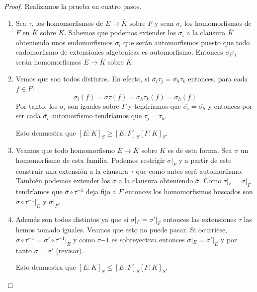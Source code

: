\begin{proof}
Realizamos la prueba en cuatro pasos.

\begin{enumerate}
\item Sea $\tau_i$ los homomorfismos de $E \to \overline{K}$ sobre $F$ y sean $\sigma_i$ los homomorfismos de $F$ en $\overline{K}$ sobre $K$. Sabemos que podemos extender los $\sigma_i$ a la clausura $\overline{K}$ obteniendo unos endomorfismos $\overline{\sigma_i}$ que serán automorfismos puesto que todo endomorfismo de extensiones algebraicas es automorfismo. Entonces $\overline{\sigma_i}\tau_i$ serán homomorfismos $E \to \overline{K}$ sobre $K$. 
\item Vemos que son todos distintos. En efecto, si $\overline{\sigma_i} \tau_j = \overline{\sigma_h}\tau_k$ entonces, para cada $f \in F$: $$\sigma_i(f) = \overline{\sigma}\tau(f) = \overline{\sigma_h}\tau_k(f) = \sigma_h(f)$$ Por tanto, los $\sigma_i$ son iguales sobre $F$ y tendríamos que $\overline{\sigma_i} = \overline{\sigma_h}$ y entonces por ser cada $\overline{\sigma_i}$ automorfismo tendríamos que $\tau_j = \tau_k$. 

Esto demuestra que $[E:K]_S \ge [E:F]_S[F:K]_S$. 
\item Veamos que todo homomorfismo $E \to \overline{K}$ sobre $K$ es de esta forma. Sea $\sigma$ un homomorfismo de esta familia. Podemos restrigir $\sigma|_F$ y a partir de este construir una extensión a la clausura $\tau$ que como antes será automorfismo. También podemos extender los $\sigma$ a la clausura obteniendo $\overline{\sigma}$. Como $\tau|_F = \sigma|_F$ tendríamos que $\overline{\sigma} \circ \tau^{-1}$ deja fijo a $F$ entonces los homomorfismos buscados son $\overline{\sigma} \circ \tau^{-1}|_E$ y $\sigma|_F$. 

\item Además son todos distintos ya que si $\sigma|_F = \sigma'|_F$ entonces las extensiones $\tau$ las hemos tomado iguales. Veamos que esto no puede pasar. Si ocurriese, $\sigma \circ \tau^{-1} = \sigma' \circ \tau^{-1}|_E $  y como $\tau{-1}$ es sobreyectiva entonces $\overline{\sigma}|_E = \overline{\sigma}'|_E$ y por tanto $\sigma = \sigma'$ (revisar).

Esto demuestra que $[E:K]_S \le [E:F]_S [F:K]_S$. 
\end{enumerate}
\end{proof}

